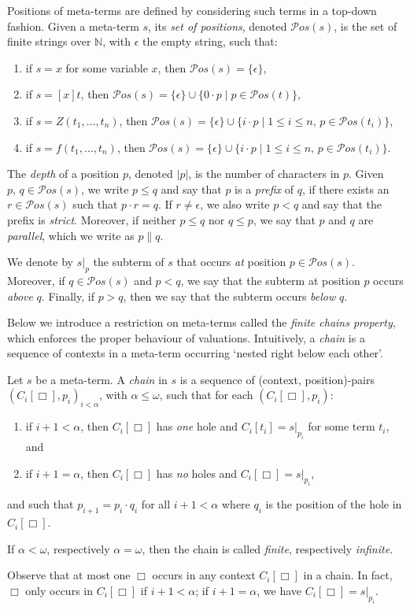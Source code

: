 \documentclass{LMCS}
\theoremstyle{plain}
\theoremstyle{definition}
\newcommand{\pos}[1]{\mathcal{P}os(#1)}
\newcommand{\natnum}{\mathbb{N}}
\newcommand{\seper}{\; | \;}
\begin{document}
Positions of meta-terms are defined by considering such terms in a top-down fashion. Given a meta-term $s$, its \emph{set of positions}, denoted $\pos{s}$, is the set of finite strings over $\natnum$, with $\epsilon$ the empty string, such that:
\begin{enumerate}[(1)]
\item
if $s = x$ for some variable $x$, then $\pos{s} = \{ \epsilon \}$,
\item
if $s = [x] t$, then $\pos{s} = \{ \epsilon \} \cup \{ 0 \cdot p \seper p \in \pos{t} \}$,
\item
if $s = Z(t_1, \ldots, t_n)$, then $\pos{s} = \{ \epsilon \} \cup \{ i \cdot p \seper 1 \leq i \leq n, \, p \in \pos{t_i} \}$,
\item
if $s = f(t_1, \ldots, t_n)$, then $\pos{s} = \{ \epsilon \} \cup \{ i \cdot p \seper 1 \leq i \leq n, \, p \in \pos{t_i} \}$.
\end{enumerate}

The \emph{depth} of a position $p$, denoted $\vert p \vert$, is the
number of characters in $p$. Given $p, \, q \in \pos{s}$, we write $p \leq q$
and say that $p$ is a \emph{prefix} of $q$, if there exists an $r \in \pos{s}$ such that $p \cdot r = q$. If
$r \not = \epsilon$, we also write $p < q$ and say that the prefix is
\emph{strict}. Moreover, if neither $p \leq q$ nor $q \leq p$, we say that $p$
and $q$ are \emph{parallel}, which we write as $p \parallel q$. 

We denote by $s|_p$ the subterm of $s$ that occurs \emph{at} position $p \in \pos{s}$. Moreover, if $q \in \pos{s}$ and $p < q$, we say that the subterm at position $p$ occurs \emph{above} $q$. Finally, if $p > q$, then we say that the subterm occurs \emph{below} $q$.

Below we introduce a restriction on meta-terms called the \emph{finite chains property}, which enforces the proper behaviour of valuations. Intuitively, a \emph{chain} is a sequence of contexts in a meta-term occurring `nested right below each other'.
\begin{defi}
Let $s$ be a meta-term.  A \emph{chain} in $s$ is a sequence
of (context, position)-pairs $(C_i[\Box],p_i)_{i < \alpha}$, with
$\alpha \leq \omega$, such that for each $(C_i[\Box], p_i)$:
\begin{enumerate}[(1)]
\item
if $i + 1 < \alpha$, then $C_i[\Box]$ has \emph{one} hole and $C_i[t_i] = s|_{p_i}$ for some term $t_i$, and
\item
if $i + 1 = \alpha$, then $C_i[\Box]$ has \emph{no} holes and $C_i[\Box] = s|_{p_i}$,
\end{enumerate}
and such that $p_{i+1} = p_i \cdot q_i$ for all $i + 1 < \alpha$ where $q_i$ is the position of the hole in $C_i[\Box]$.

If $\alpha < \omega$, respectively
$\alpha = \omega$, then the chain is called \emph{finite},
respectively \emph{infinite}.
\end{defi}
\noindent Observe that at most one $\Box$ occurs in any context $C_i[\Box]$ in a chain. In fact, $\Box$ only occurs in $C_i[\Box]$ if $i + 1 < \alpha$; if $i + 1 = \alpha$, we have $C_i[\Box] = s|_{p_i}$.
\end{document}
